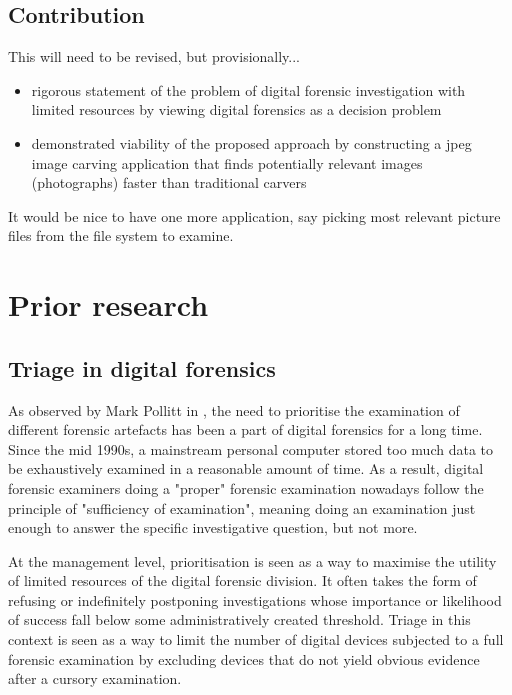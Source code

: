 \documentclass[10pt,a4paper]{article}
\begin{document}
\subsection{Contribution}

This will need to be revised, but provisionally...

\begin{itemize}
\item{rigorous statement of the problem of digital forensic investigation with limited resources by viewing digital forensics as a decision problem}
\item{demonstrated viability of the proposed approach by constructing a jpeg image carving application that finds potentially relevant images (photographs) faster than traditional carvers}
\end{itemize}

It would be nice to have one more application, say picking most relevant picture files from the file system to examine.

\section{Prior research}

\subsection{Triage in digital forensics}

As observed by Mark Pollitt in \cite{pollitt2013triage}, the need to prioritise the examination of different forensic artefacts has been a part of digital forensics for a long time. Since the mid 1990s, a mainstream personal computer stored too much data to be exhaustively examined in a reasonable amount of time.  As a result, digital forensic examiners doing a "proper" forensic examination nowadays follow the principle of "sufficiency of examination", meaning doing an examination just enough to answer the specific investigative question, but not more. 

At the management level, prioritisation is seen as a way to maximise the utility of limited resources of the digital forensic division. It often takes the form of refusing or indefinitely postponing investigations whose importance or likelihood of success fall below some administratively created threshold.  Triage in this context is seen as a way to limit the number of digital devices subjected to a full forensic examination by excluding devices that do not yield obvious evidence after a cursory examination.
\end{document}
